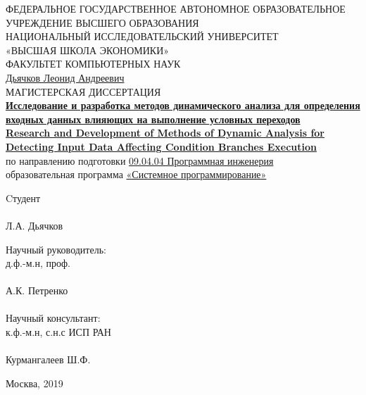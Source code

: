 \begin{titlepage}
	\begin{center}
	\textsc{\normalsize{ФЕДЕРАЛЬНОЕ ГОСУДАРСТВЕННОЕ АВТОНОМНОЕ ОБРАЗОВАТЕЛЬНОЕ}}\\
\textsc{\normalsize{УЧРЕЖДЕНИЕ ВЫСШЕГО ОБРАЗОВАНИЯ}}\\
\textsc{\normalsize{НАЦИОНАЛЬНЫЙ ИССЛЕДОВАТЕЛЬСКИЙ УНИВЕРСИТЕТ}}\\
\textsc{\normalsize{{«ВЫСШАЯ ШКОЛА ЭКОНОМИКИ»}}\\
	\normalsize{ФАКУЛЬТЕТ КОМПЬЮТЕРНЫХ НАУК}}
	\\[.5cm]
	\large{\underline{Дьячков Леонид Андреевич}}\\[.5cm]

	\large{МАГИСТЕРСКАЯ ДИССЕРТАЦИЯ}\\[.8cm]

	{\large {\ul{\textbf{Исследование и разработка методов динамического анализа для определения входных данных влияющих на выполнение условных переходов}}}} \\
	{\large {\ul{\textbf{Research and Development of Methods of Dynamic Analysis for Detecting Input Data Affecting Condition Branches Execution}}}}\\

	по направлению подготовки \underline{09.04.04 Программная инженерия}\\
	образовательная программа \underline{«Системное программирование»}

	\begin{flushleft}
	Cтудент\\
	\underline{\hspace{3cm}}\\
	Л.А. Дьячков\\
	\end{flushleft}
	\begin{flushright}
		
		Научный руководитель: \\ 
		д.ф.-м.н, проф. \\
		\underline{\hspace{3cm}}\\
		А.К. Петренко \\
		\\
		Научный консультант: \\ 
		к.ф.-м.н, с.н.с ИСП РАН \\
		\underline{\hspace{3cm}}\\
		Курмангалеев Ш.Ф. \\
	\end{flushright}
	\vfill
	
	Москва, 2019
	\end{center}

\end{titlepage}


